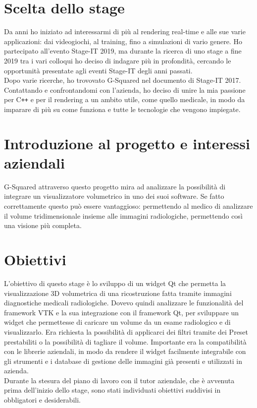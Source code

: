 \section{Scelta dello stage}
\label{scelta-dello-stage}
Da anni ho iniziato ad interessarmi di più al rendering real-time e alle sue varie applicazioni: dai videogiochi, al training, fino a simulazioni di vario genere.
Ho partecipato all'evento Stage-IT 2019, ma durante la ricerca di uno stage a fine 2019 tra i vari colloqui ho deciso di indagare più in profondità, cercando le opportunità presentate agli eventi Stage-IT degli anni passati. \\
Dopo varie ricerche, ho trovovato G-Squared nel documento di Stage-IT 2017. Contattando e confrontandomi con l'azienda, ho deciso di unire la mia passione per C\texttt{++} e per il rendering a un ambito utile, come quello medicale, in modo da imparare di più su come funziona e tutte le tecnologie che vengono impiegate.

\section{Introduzione al progetto e interessi aziendali}
G-Squared attraverso questo progetto mira ad analizzare la possibilità di integrare un visualizzatore volumetrico in uno dei suoi software. Se fatto correttamente questo può essere vantaggioso: permettendo al medico di analizzare il volume tridimensionale insieme alle immagini radiologiche, permettendo così una visione più completa.

\section{Obiettivi}
L'obiettivo di questo stage è lo sviluppo di un widget Qt che permetta la visualizzazione 3D volumetrica di una ricostruzione fatta tramite immagini diagnostiche medicali radiologiche. Dovevo quindi analizzare le funzionalità del framework VTK e la sua integrazione con il framework Qt, per sviluppare un widget che permettesse di caricare un volume da un esame radiologico e di visualizzarlo. Era richiesta la possibilità di applicarci dei filtri tramite dei Preset prestabiliti o la possibilità di tagliare il volume.
Importante era la compatibilità con le librerie aziendali, in modo da rendere il widget facilmente integrabile con gli strumenti e i database di gestione delle immagini già presenti e utilizzati in azienda.\\
Durante la stesura del piano di lavoro con il tutor aziendale, che è avvenuta prima dell’inizio dello stage, sono stati individuati obiettivi suddivisi in obbligatori e desiderabili.

